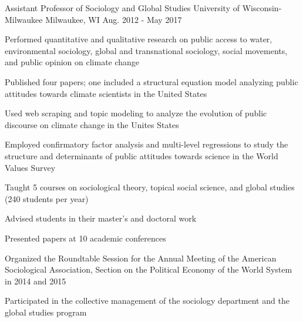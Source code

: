 \begin{cventries}
  \cventry
    {Assistant Professor of Sociology and Global Studies}
    {University of Wisconsin-Milwaukee}
    {Milwaukee, WI}
    {Aug. 2012 - May 2017}
    {
      \begin{cvitems}
        \item {Performed quantitative and qualitative research on public access to water, environmental sociology, global and transnational sociology, social movements, and public opinion on climate change}
        \item {Published four papers; one included a structural equation model analyzing public attitudes towards climate scientists in the United States}
        \item {Used web scraping and topic modeling to analyze the evolution of public discourse on climate change in the Unites States}
        \item {Employed confirmatory factor analysis and multi-level regressions to study the structure and determinants of public attitudes towards science in the World Values Survey}
        \item {Taught 5 courses on sociological theory, topical social science, and global studies (240 students per year)}
        \item {Advised students in their master’s and doctoral work}
        \item {Presented papers at 10 academic conferences}
        \item {Organized the Roundtable Session for the Annual Meeting of the American Sociological Association, Section on the Political Economy of the World System in 2014 and 2015}
        \item {Participated in the collective management of the sociology department and the global studies program}
      \end{cvitems}
    }
\end{cventries}
